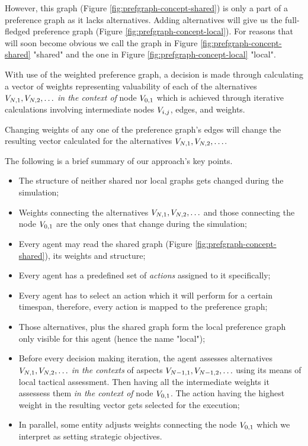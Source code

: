 However, this graph (Figure \ref{fig:prefgraph-concept-shared}) is only a part of a preference graph as it lacks
alternatives. Adding alternatives will give us the full-fledged preference graph (Figure
\ref{fig:prefgraph-concept-local}). For reasons that will soon become obvious we call the graph in Figure
\ref{fig:prefgraph-concept-shared} "shared" and the one in Figure \ref{fig:prefgraph-concept-local} "local".

With use of the weighted preference graph, a decision is made through calculating a vector of weights representing
valuability of each of the alternatives $V_{N,1}, V_{N,2},\ldots$ \textit{in the context of} node $V_{0,1}$ which is
achieved through iterative calculations involving intermediate nodes $V_{i,j}$, edges, and weights.

Changing weights of any one of the preference graph's edges will change the resulting vector calculated for the alternatives
$V_{N,1}, V_{N,2},\ldots$.

The following is a brief summary of our approach's key points.

\begin{itemize}
    \item The structure of neither shared nor local graphs gets changed during the simulation;
    \item Weights connecting the alternatives $V_{N,1}, V_{N,2},\ldots$ and those connecting the node $V_{0,1}$ are the only ones that
        change during the simulation;
    \item Every agent may read the shared graph (Figure \ref{fig:prefgraph-concept-shared}), its weights and structure;
    \item Every agent has a predefined set of \textit{actions} assigned to it specifically;
    \item Every agent has to select an action which it will perform for a certain timespan, therefore, every action is
        mapped to the preference graph;
    \item Those alternatives, plus the shared graph form the local preference graph only visible for this agent (hence
        the name "local");
    \item Before every decision making iteration, the agent assesses alternatives $V_{N,1}, V_{N,2},\ldots$ \textit{in the contexts} of
        aspects $ V_{N-1,1}, V_{N-1,2}, \ldots $ using its means of local tactical assessment. Then having all the intermediate weights
        it assessess them \textit{in the context of} node $V_{0,1}$. The action having the highest weight in the
        resulting vector gets selected for the execution;
    \item In parallel, some entity adjusts weights connecting the node $V_{0,1}$ which we interpret as setting
        strategic objectives.
\end{itemize}

